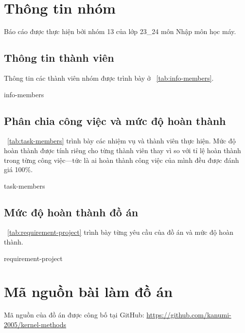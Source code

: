 \section{Thông tin nhóm}

Báo cáo được thực hiện bởi nhóm 13 của lớp 23\_24 môn Nhập môn học máy.

\subsection{Thông tin thành viên}
Thông tin các thành viên nhóm được trình bày ở
\tablename~\ref{tab:info-members}.

{info-members}

\subsection{Phân chia công việc và mức độ hoàn thành}

\tablename~\ref{tab:task-members} trình bày các nhiệm vụ và thành viên thực
hiện. Mức độ hoàn thành được tính riêng cho từng thành viên thay vì so với tỉ
lệ hoàn thành trong từng công việc---tức là ai hoàn thành công việc của mình
đều được đánh giá 100\%.

{task-members}

\subsection{Mức độ hoàn thành đồ án}

\tablename~\ref{tab:requirement-project} trình bày từng yêu cầu của đồ án và
mức độ hoàn thành.

{requirement-project}

\section{Mã nguồn bài làm đồ án}
Mã nguồn của đồ án được công bố tại GitHub:
\url{https://github.com/kanumi-2005/kernel-methods}
